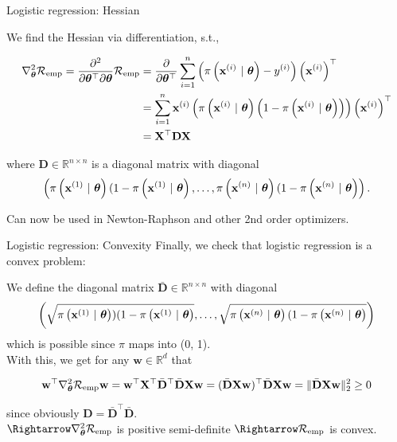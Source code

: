 \documentclass[11pt,compress,t,notes=noshow, xcolor=table]{beamer}
\begin{document}
\begin{vbframe}{Logistic regression: Hessian}

We find the Hessian via differentiation, s.t.,

{\small
\begin{align*}
  \nabla^2_{\thetab}\riske  = \frac{\partial^2}{\partial{\thetab^\top}\partial\thetab}\riske  & =  
 \frac{\partial}{\partial{\thetab^\top}} \sumin \left(\pixit - \yi\right)\left(\xi\right)^\top\\
 & =  
  \sum^n_{i=1}\xi \left(\pixit\left(1-\pixit\right)\right)\left(\xi\right)^\top\\
  & =  
\mathbf{X}^\top \mathbf{D} \mathbf{X}\\
\end{align*}

where $\mathbf{D} \in \mathbb{R}^{n\times n}$ is a diagonal matrix with diagonal 
$$\left(\pixit[1](1-\pixit[1], \dots, \pixit[n](1-\pixit[n]\right).$$
}

Can now be used in Newton-Raphson and other 2nd order optimizers.


\end{vbframe}

\begin{vbframe}{Logistic regression: Convexity}
Finally, we check that logistic regression is a convex problem:
\vspace*{0.3cm}

We define the diagonal matrix $\bar{\mathbf{D}} \in \mathbb{R}^{n \times n}$ with diagonal 
$$\left(\sqrt{\pixit[1])(1-\pixit[1]}, \dots, \sqrt{\pixit[n](1-\pixit[n]}\right) $$
which is possible since $\pi$ maps into (0, 1). \\
\vspace*{0.3cm}
With this, we get for any $\mathbf{w} \in \mathbb{R}^d$ that

$$\mathbf{w}^\top  \nabla^2_{\thetab}\riske \mathbf{w} =   \mathbf{w}^\top  \mathbf{X}^\top \bar{\mathbf{D}}^\top \bar{\mathbf{D}}\mathbf{X} \mathbf{w} = (\bar{\mathbf{D}}\mathbf{X} \mathbf{w})^\top\bar{\mathbf{D}}\mathbf{X} \mathbf{w} = \Vert \bar{\mathbf{D}}\mathbf{X} \mathbf{w} \Vert^2_2 \geq 0$$

since obviously $\mathbf{D} = \bar{\mathbf{D}}^\top \bar{\mathbf{D}}.$ \\
\vspace*{0.3cm}
$\Rightarrow \nabla^2_{\thetab}\riske$ is positive semi-definite $\Rightarrow \riske$ is convex.

\end{vbframe}

\endlecture
\end{document}
